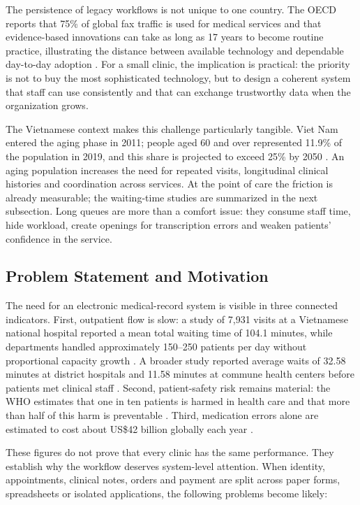 \documentclass[a4paper,12pt]{article}
\begin{document}
The persistence of legacy workflows is not unique to one country. The OECD reports that 75\% of global fax traffic is used for medical services and that evidence-based innovations can take as long as 17 years to become routine practice, illustrating the distance between available technology and dependable day-to-day adoption \citep{OECD2023DigitalHealth}. For a small clinic, the implication is practical: the priority is not to buy the most sophisticated technology, but to design a coherent system that staff can use consistently and that can exchange trustworthy data when the organization grows.

The Vietnamese context makes this challenge particularly tangible. Viet Nam entered the aging phase in 2011; people aged 60 and over represented 11.9\% of the population in 2019, and this share is projected to exceed 25\% by 2050 \citep{UNFPA2021Ageing}. An aging population increases the need for repeated visits, longitudinal clinical histories and coordination across services. At the point of care the friction is already measurable; the waiting-time studies are summarized in the next subsection. Long queues are more than a comfort issue: they consume staff time, hide workload, create openings for transcription errors and weaken patients' confidence in the service.

\subsection{Problem Statement and Motivation}
The need for an electronic medical-record system is visible in three connected indicators. First, outpatient flow is slow: a study of 7,931 visits at a Vietnamese national hospital reported a mean total waiting time of 104.1 minutes, while departments handled approximately 150--250 patients per day without proportional capacity growth \citep{Nguyen2018Waiting}. A broader study reported average waits of 32.58 minutes at district hospitals and 11.58 minutes at commune health centers before patients met clinical staff \citep{Nguyen2020Outpatient}. Second, patient-safety risk remains material: the WHO estimates that one in ten patients is harmed in health care and that more than half of this harm is preventable \citep{WHO2023Safety}. Third, medication errors alone are estimated to cost about US\$42 billion globally each year \citep{WHO2017Medication}.

These figures do not prove that every clinic has the same performance. They establish why the workflow deserves system-level attention. When identity, appointments, clinical notes, orders and payment are split across paper forms, spreadsheets or isolated applications, the following problems become likely:
\end{document}

